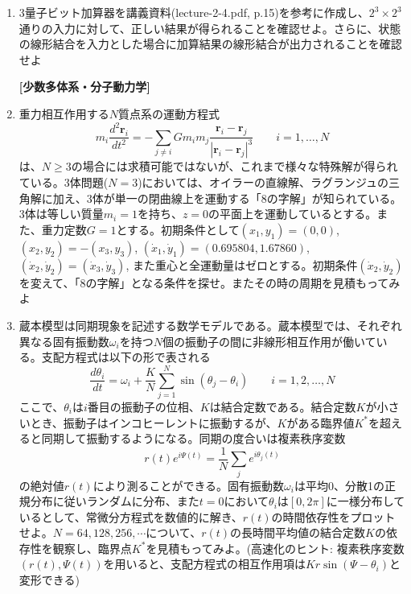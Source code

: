 \documentclass[11pt]{jarticle}
\begin{document}
\begin{enumerate}
\item 3量子ビット加算器を講義資料(lecture-2-4.pdf, p.15)を参考に作成し、$2^3 \times 2^3$通りの入力に対して、正しい結果が得られることを確認せよ。さらに、状態の線形結合を入力とした場合に加算結果の線形結合が出力されることを確認せよ

\hspace*{-2em} {\bf [少数多体系・分子動力学]}

\item 重力相互作用する$N$質点系の運動方程式
  \[
  m_i \frac{d^2 \mathbf{r}_i}{dt^2} = - \sum_{j \ne i} G m_i m_j \frac{\mathbf{r}_i - \mathbf{r}_j}{|\mathbf{r}_i - \mathbf{r}_j|^3} \qquad i = 1,\ldots,N
  \]
  は、$N \ge 3$の場合には求積可能ではないが、これまで様々な特殊解が得られている。3体問題($N=3$)においては、オイラーの直線解、ラグランジュの三角解に加え、3体が単一の閉曲線上を運動する「8の字解」が知られている。3体は等しい質量$m_i=1$を持ち、$z=0$の平面上を運動しているとする。また、重力定数$G=1$とする。初期条件として$(x_1,y_1)=(0,0)$, $(x_2,y_2)=-(x_3,y_3)$, $(\dot{x}_1,\dot{y}_1)=(0.695804,1.67860)$, $(\dot{x}_2,\dot{y}_2)=(\dot{x}_3,\dot{y}_3)$, また重心と全運動量はゼロとする。初期条件$(\dot{x}_2,\dot{y}_2)$を変えて、「8の字解」となる条件を探せ。またその時の周期を見積もってみよ
  \begin{center}
  \end{center}
  
\item 蔵本模型は同期現象を記述する数学モデルである。蔵本模型では、それぞれ異なる固有振動数$\omega_i$を持つ$N$個の振動子の間に非線形相互作用が働いている。支配方程式は以下の形で表される
  \[
  \frac{d\theta_i}{dt} = \omega_i + \frac{K}{N} \sum_{j=1}^N \sin(\theta_j - \theta_i) \qquad i=1,2,\ldots,N
  \]
  ここで、$\theta_i$は$i$番目の振動子の位相、$K$は結合定数である。結合定数$K$が小さいとき、振動子はインコヒーレントに振動するが、$K$がある臨界値$K^*$を超えると同期して振動するようになる。同期の度合いは複素秩序変数
  \[
  r(t) e^{i\Psi(t)} = \frac{1}{N} \sum_j e^{i\theta_j(t)}
  \]
  の絶対値$r(t)$により測ることができる。固有振動数$\omega_i$は平均0、分散1の正規分布に従いランダムに分布、また$t=0$において$\theta_i$は$[0,2\pi]$に一様分布しているとして、常微分方程式を数値的に解き、$r(t)$の時間依存性をプロットせよ。$N=64,128,256,\cdots$について、$r(t)$の長時間平均値の結合定数$K$の依存性を観察し、臨界点$K^*$を見積もってみよ。(高速化のヒント: 複素秩序変数$(r(t),\Psi(t))$を用いると、支配方程式の相互作用項は$K r \sin(\Psi-\theta_i)$と変形できる)


\end{enumerate}
\end{document}
